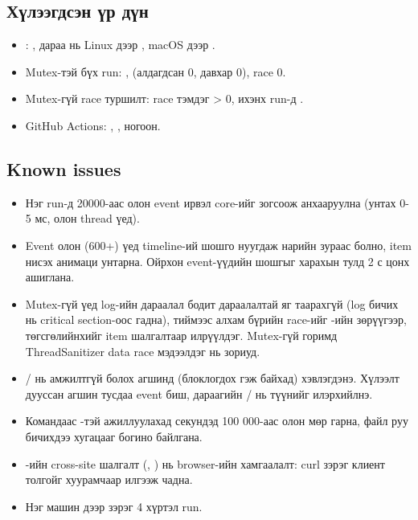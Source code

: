 \documentclass[12pt,a4paper]{article}
\begin{document}
\subsection{Хүлээгдсэн үр дүн}
\begin{itemize}
  \item {}: , дараа нь Linux дээр , macOS дээр .
  \item Mutex-тэй бүх run: ,  (алдагдсан 0, давхар 0), race 0.
  \item Mutex-гүй race туршилт: race тэмдэг > 0, ихэнх run-д .
  \item GitHub Actions: , ,  ногоон.
\end{itemize}

\subsection{Known issues}
\begin{itemize}
  \item Нэг run-д 20000-аас олон event ирвэл core-ийг зогсоож анхааруулна (унтах 0-5 мс, олон thread үед).
  \item Event олон (600+) үед timeline-ий шошго нуугдаж нарийн зураас болно, item нисэх анимаци унтарна. Ойрхон event-үүдийн шошгыг харахын тулд 2 с цонх ашиглана.
  \item Mutex-гүй үед log-ийн дараалал бодит дараалалтай яг таарахгүй (log бичих нь critical section-оос гадна), тиймээс алхам бүрийн race-ийг -ийн зөрүүгээр, төгсгөлийнхийг item шалгалтаар илрүүлдэг. Mutex-гүй горимд ThreadSanitizer data race мэдээлдэг нь зориуд.
  \item {}/ нь  амжилтгүй болох агшинд (блоклогдох гэж байхад) хэвлэгдэнэ. Хүлээлт дууссан агшин тусдаа event биш, дараагийн / нь түүнийг илэрхийлнэ.
  \item Командаас -тэй ажиллуулахад секундэд 100 000-аас олон мөр гарна, файл руу бичихдээ хугацааг богино байлгана.
  \item {}-ийн cross-site шалгалт (, ) нь browser-ийн хамгаалалт: curl зэрэг клиент толгойг хуурамчаар илгээж чадна.
  \item Нэг машин дээр зэрэг 4 хүртэл run.
\end{itemize}
\end{document}
